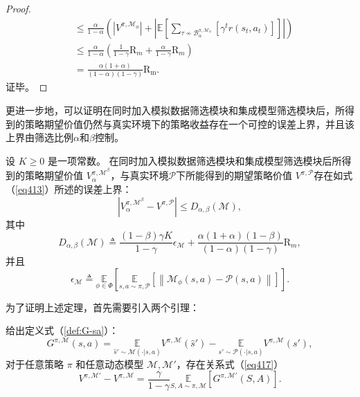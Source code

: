 \begin{proof}
\begin{equation}
\begin{aligned}
&\leq\frac{\alpha}{1-\alpha}\left(\left|V^{\pi,\mathcal{M}_\phi}\right|+\left|\mathbb{E}\left[{\sum}_{\tau \not\sim\mathcal{B}_\alpha^{\pi,\mathcal{M}_\phi}}\left[\gamma^t r(s_t,a_t)\right]\right]\right|\right)\\
&\leq \frac{\alpha}{1-\alpha}\left(\frac{1}{1-\gamma}\mathrm{R}_m+\frac{\alpha}{1-\gamma}\mathrm{R}_m\right) \\
&=\frac{\alpha(1+\alpha)}{(1-\alpha)(1-\gamma)}\mathrm{R_{m}}. \label{eq:lem42}
\end{aligned}
\end{equation}
证毕。
\end{proof}

更进一步地，可以证明在同时加入模拟数据筛选模块和集成模型筛选模块后，所得到的策略期望价值仍然与真实环境下的策略收益存在一个可控的误差上界，并且该上界由筛选比例$\alpha$和$\beta$控制。

\begin{theorem}\label{the:MBDP-bound}

设 $K\geq 0$ 是一项常数。 在同时加入模拟数据筛选模块和集成模型筛选模块后所得到的策略期望价值 ${V}_\alpha^{\pi, \mathcal{M}^\beta}$，与真实环境$\mathcal{P}$下所能得到的期望策略价值 ${V}^{\pi, \mathcal{P}}$存在如式（\ref{eq413}）所述的误差上界：
\begin{equation}\label{eq413}
\left|{V}_\alpha^{\pi, \mathcal{M}^\beta}-{V}^{\pi, \mathcal{P}}\right|\leq D_{\alpha,\beta}(\mathcal{M}),
\end{equation}
其中
\begin{equation}\label{eq:MBDP-bound}
D_{\alpha,\beta}(\mathcal{M})\triangleq\frac{(1-\beta)\gamma K}{1-\gamma}\epsilon_{\mathcal{M}}+\frac{\alpha(1+\alpha)(1-\beta)}{(1-\alpha)(1-\gamma)}\mathrm{R}_m,
\end{equation}
并且
\begin{equation}\label{def:delta-M}
\epsilon_{\mathcal{M}}\triangleq\underset{\phi\in\Phi}{\mathbb{E}}\left[\underset{s,a\sim \pi,\mathcal{P}}{\mathbb{E}}\left[\left\|\mathcal{M}_\phi(s, a)-\mathcal{P}(s, a)\right\|\right]\right].
\end{equation}

\end{theorem}
为了证明上述定理，首先需要引入两个引理：
\begin{lemma}\label{lem:proof-for-lem41}
给出定义式（\ref{def:G-sa}）：
\begin{equation}\label{def:G-sa}
G^{\pi,\mathcal{M}}(s,a)=\underset{\hat{s}'\sim\mathcal{M}(\cdot|s,a)}{\mathbb{E}}{{V}^{\pi,\mathcal{M}}}(\hat{s}') - \underset{s'\sim\mathcal{P}(\cdot|s,a)}{\mathbb{E}}{{V}^{\pi,\mathcal{M}}}(s'),
\end{equation}
对于任意策略 $\pi$ 和任意动态模型 $\mathcal{M},\mathcal{M}'$，存在关系式（\ref{eq417}）
\begin{equation}\label{eq417}
{V}^{\pi,\mathcal{M}'} - {V}^{\pi,\mathcal{M}} = \frac{\gamma}{1-\gamma}\underset{S,A\sim\pi,\mathcal{M}}{\mathbb{E}}\left[G^{\pi,\mathcal{M}'}(S,A)\right].
\end{equation}
\end{lemma}

